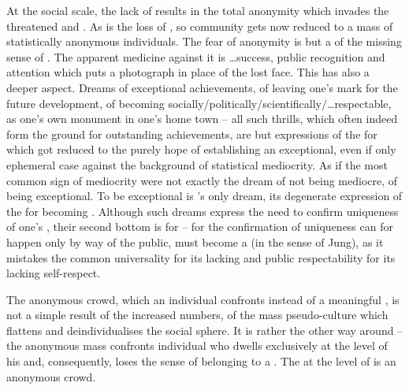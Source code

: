 \pa
At the social scale, the lack of  results in the total
anonymity which invades the threatened and . As
 is the loss of , so community gets now reduced
to a mass of statistically anonymous individuals. The fear of anonymity
is but a  of the missing sense of . The apparent 
medicine against it is \ldots success, public recognition and attention which
puts a photograph in place of the lost face. %
This has also a deeper aspect. Dreams of exceptional achievements, of leaving
one's mark for the future development, of becoming
socially/politically/scientifically/\ldots respectable, as one's own monument in
one's home town -- all such  thrills, which often indeed form the
ground for outstanding achievements, are but expressions of the  for
 which got reduced to the purely  hope of establishing
an exceptional, even if only ephemeral case against the background of
statistical mediocrity. As if the most common sign of mediocrity were not
exactly the dream of not being mediocre, of being exceptional. To be exceptional
is 's only dream, its degenerate expression of the  for
becoming .  Although such dreams express the need to confirm uniqueness
of one's , their second bottom is  for  -- for
the confirmation of uniqueness can for  happen only by way of the
public,  must become a  (in the sense of Jung), as it
mistakes the common universality for its lacking  and public
respectability for its lacking self-respect.


The anonymous crowd, which an individual confronts instead of a meaningful
, is not a simple result of the increased numbers, of the mass
pseudo-culture which flattens and deindividualises the social sphere. It is
rather the other way around -- the anonymous mass confronts individual who
dwells exclusively at the level of his  and, consequently, loses the
 sense of belonging to a . The  at the level of  is an anonymous crowd.

